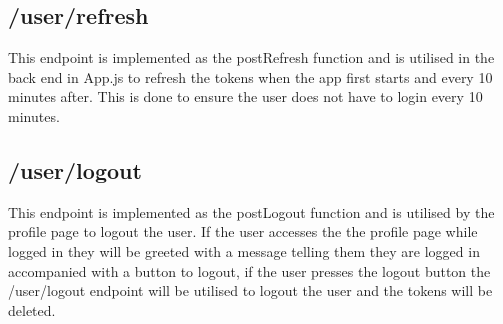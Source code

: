 \documentclass[12pt,a4paper]{article}
\begin{document}
			\begin{center}
			\end{center}

		\newpage

		\subsection{/user/refresh}
			This endpoint is implemented as the postRefresh function and is utilised in the back end 
			in App.js to refresh the tokens when the app first starts and every 10 minutes after. 
			This is done to ensure the user does not have to login every 10 minutes.\\
		
		\subsection{/user/logout}
			This endpoint is implemented as the postLogout function and is utilised by the profile 
			page to logout the user. If the user accesses the the profile page while logged in they 
			will be greeted with a message telling them they are logged in accompanied with a button 
			to logout, if the user presses the logout button the /user/logout endpoint will be utilised 
			to logout the user and the tokens will be deleted.\\

			\begin{center}
			\end{center}
	
\end{document}
